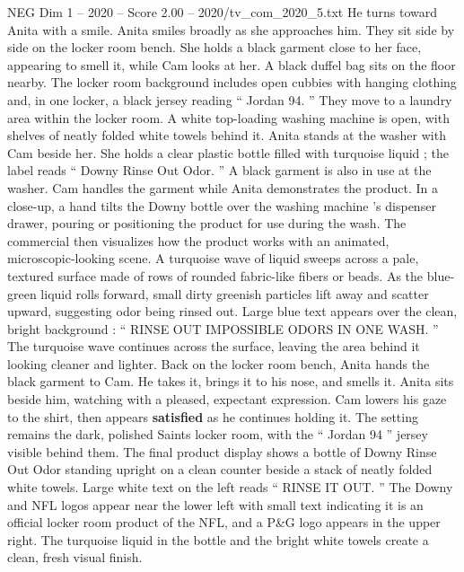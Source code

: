 \begin{textsample}{NEG Dim 1 – 2020 – Score 2.00 – 2020/tv\_com\_2020\_5.txt}
He turns toward Anita with a smile.
Anita smiles broadly as she approaches him.
They sit side by side on the locker room bench.
She holds a black garment close to her face, appearing to smell it, while Cam looks at her.
A black duffel bag sits on the floor nearby.
The locker room background includes open cubbies with hanging clothing and, in one locker, a black jersey reading “ Jordan 94. ” They move to a laundry area within the locker room.
A white top-loading washing machine is open, with shelves of neatly folded white towels behind it.
Anita stands at the washer with Cam beside her.
She holds a clear plastic bottle filled with turquoise liquid ; the label reads “ Downy Rinse Out Odor. ” A black garment is also in use at the washer.
Cam handles the garment while Anita demonstrates the product.
In a close-up, a hand tilts the Downy bottle over the washing machine ’s dispenser drawer, pouring or positioning the product for use during the wash.
The commercial then visualizes how the product works with an animated, microscopic-looking scene.
A turquoise wave of liquid sweeps across a pale, textured surface made of rows of rounded fabric-like fibers or beads.
As the blue-green liquid rolls forward, small dirty greenish particles lift away and scatter upward, suggesting odor being rinsed out.
Large blue text appears over the clean, bright background : “ RINSE OUT IMPOSSIBLE ODORS IN ONE WASH. ” The turquoise wave continues across the surface, leaving the area behind it looking cleaner and lighter.
Back on the locker room bench, Anita hands the black garment to Cam.
He takes it, brings it to his nose, and smells it.
Anita sits beside him, watching with a pleased, expectant expression.
Cam lowers his gaze to the shirt, then appears \textbf{satisfied} as he continues holding it.
The setting remains the dark, polished Saints locker room, with the “ Jordan 94 ” jersey visible behind them.
The final product display shows a bottle of Downy Rinse Out Odor standing upright on a clean counter beside a stack of neatly folded white towels.
Large white text on the left reads “ RINSE IT OUT. ” The Downy and NFL logos appear near the lower left with small text indicating it is an official locker room product of the NFL, and a P\&G logo appears in the upper right.
The turquoise liquid in the bottle and the bright white towels create a clean, fresh visual finish.

\end{textsample}
